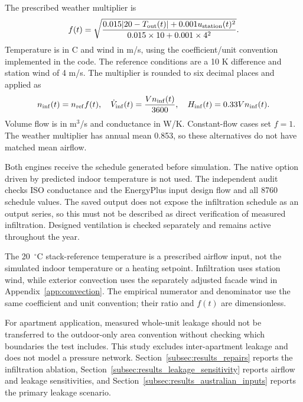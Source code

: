 The prescribed weather multiplier is
\begin{equation}
f(t)=\sqrt{\frac{0.015|20-T_{\rm out}(t)|+0.001u_{\rm station}(t)^2}
{0.015\times10+0.001\times4^2}}.
\end{equation}
Temperature is in \textdegree C and wind in m/s, using the coefficient/unit convention implemented in the code. The reference conditions are a 10 K difference and station wind of 4 m/s. The multiplier is rounded to six decimal places and applied as
\begin{equation}
n_{\rm inf}(t)=n_{\rm ref}f(t),\quad
\dot V_{\rm inf}(t)=\frac{Vn_{\rm inf}(t)}{3600},\quad
H_{\rm inf}(t)=0.33Vn_{\rm inf}(t).
\end{equation}
Volume flow is in m$^3$/s and conductance in W/K. Constant-flow cases set $f=1$. The weather multiplier has annual mean 0.853, so these alternatives do not have matched mean airflow.

Both engines receive the schedule generated before simulation. The native option driven by predicted indoor temperature is not used. The independent audit checks ISO conductance and the EnergyPlus input design flow and all 8760 schedule values. The saved output does not expose the infiltration schedule as an output series, so this must not be described as direct verification of measured infiltration. Designed ventilation is checked separately and remains active throughout the year.

The 20~$^\circ$C stack-reference temperature is a prescribed airflow input, not the simulated indoor temperature or a heating setpoint. Infiltration uses station wind, while exterior convection uses the separately adjusted facade wind in Appendix~\ref{app:convection}. The empirical numerator and denominator use the same coefficient and unit convention; their ratio and $f(t)$ are dimensionless.

For apartment application, measured whole-unit leakage should not be transferred to the outdoor-only area convention without checking which boundaries the test includes. This study excludes inter-apartment leakage and does not model a pressure network. Section~\ref{subsec:results_repairs} reports the infiltration ablation, Section~\ref{subsec:results_leakage_sensitivity} reports airflow and leakage sensitivities, and Section~\ref{subsec:results_australian_inputs} reports the primary leakage scenario.


